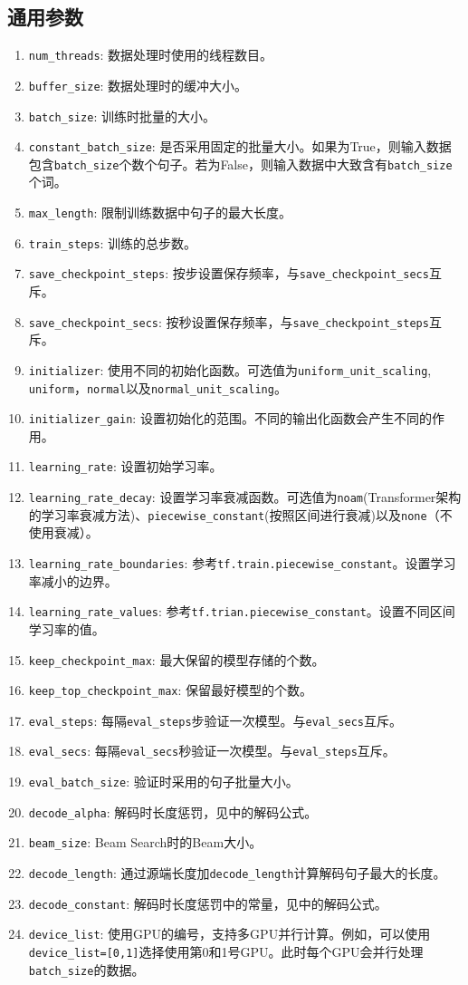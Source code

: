 \documentclass{article}
\begin{document}
\subsection{通用参数}
\begin{enumerate}
\item \verb|num_threads|: 数据处理时使用的线程数目。
\item \verb|buffer_size|: 数据处理时的缓冲大小。
\item \verb|batch_size|: 训练时批量的大小。
\item \verb|constant_batch_size|: 是否采用固定的批量大小。如果为True，则输入数据包含\verb|batch_size|个数个句子。若为False，则输入数据中大致含有\verb|batch_size|个词。
\item \verb|max_length|: 限制训练数据中句子的最大长度。
\item \verb|train_steps|: 训练的总步数。
\item \verb|save_checkpoint_steps|: 按步设置保存频率，与\verb|save_checkpoint_secs|互斥。
\item \verb|save_checkpoint_secs|: 按秒设置保存频率，与\verb|save_checkpoint_steps|互斥。
\item \verb|initializer|: 使用不同的初始化函数。可选值为\verb|uniform_unit_scaling|,\\ \verb|uniform|，\verb|normal|以及\verb|normal_unit_scaling|。
\item \verb|initializer_gain|: 设置初始化的范围。不同的输出化函数会产生不同的作用。
\item \verb|learning_rate|: 设置初始学习率。
\item \verb|learning_rate_decay|: 设置学习率衰减函数。可选值为\verb|noam|(Transformer架构的学习率衰减方法)、\verb|piecewise_constant|(按照区间进行衰减)以及\verb|none|（不使用衰减）。
\item \verb|learning_rate_boundaries|: 参考\verb|tf.train.piecewise_constant|。设置学习率减小的边界。
\item \verb|learning_rate_values|: 参考\verb|tf.trian.piecewise_constant|。设置不同区间学习率的值。
\item \verb|keep_checkpoint_max|: 最大保留的模型存储的个数。
\item \verb|keep_top_checkpoint_max|: 保留最好模型的个数。
\item \verb|eval_steps|: 每隔\verb|eval_steps|步验证一次模型。与\verb|eval_secs|互斥。
\item \verb|eval_secs|: 每隔\verb|eval_secs|秒验证一次模型。与\verb|eval_steps|互斥。
\item \verb|eval_batch_size|: 验证时采用的句子批量大小。
\item \verb|decode_alpha|: 解码时长度惩罚，见\citep{Wu:16}中的解码公式。
\item \verb|beam_size|: Beam Search时的Beam大小。
\item \verb|decode_length|: 通过源端长度加\verb|decode_length|计算解码句子最大的长度。
\item \verb|decode_constant|: 解码时长度惩罚中的常量，见\citep{Wu:16}中的解码公式。
\item \verb|device_list|: 使用GPU的编号，支持多GPU并行计算。例如，可以使用\verb|device_list=[0,1]|选择使用第0和1号GPU。此时每个GPU会并行处理\verb|batch_size|的数据。
\end{enumerate}
\end{document}
